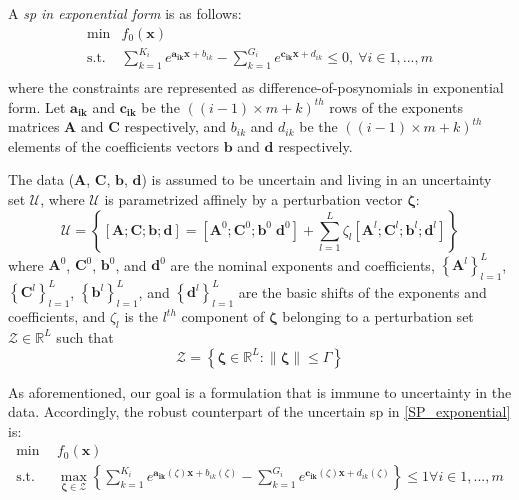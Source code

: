 A \emph{\gls{sp} in exponential form} is as follows:
\begin{equation}
    \begin{split}
	\min & f_0\left(\mathbf{x}\right) \\
	\text{s.t.} & \textstyle{\sum}_{k=1}^{K_i}e^{\mathbf{a_{ik}}\mathbf{x} + b_{ik}} - \textstyle{\sum}_{k=1}^{G_i}e^{\mathbf{c_{ik}}\mathbf{x} + d_{ik}} \leq 0,~\forall i \in 1,...,m\\
\end{split}
\label{SP_exponential}
\end{equation}
where the constraints are represented as difference-of-posynomials in exponential form.
Let $\mathbf{a_{ik}}$ and $\mathbf{c_{ik}}$ be the $((i-1)\times m + k)^{th}$ rows of the exponents matrices
$\mathbf{A}$ and $\mathbf{C}$ respectively, and $b_{ik}$ and $d_{ik}$ be the $((i-1)\times m + k)^{th}$ elements
of the coefficients vectors $\mathbf{b}$ and $\mathbf{d}$ respectively.

The data ($\mathbf{A}$, $\mathbf{C}$, $\mathbf{b}$, $\mathbf{d}$) is assumed to be uncertain and
living in an uncertainty set $\mathcal{U}$, where $\mathcal{U}$ is parametrized
affinely by a perturbation vector $\mathbf{\zeta}$:
\begin{equation}
\mathcal{U} = \left\{\left[\mathbf{A};\mathbf{C};\mathbf{b};\mathbf{d}\right] = \left[\mathbf{A}^0;\mathbf{C}^0;\mathbf{b}^0\;\mathbf{d}^0 \right] +
\textstyle{\sum_{l=1}^{L}\zeta_l\left[\mathbf{A}^l;\mathbf{C}^l;\mathbf{b}^l; \mathbf{d}^l\right]}\right\}
\label{Data}
\end{equation}
where $\mathbf{A}^0$, $\mathbf{C}^0$, $\mathbf{b}^0$, and $\mathbf{d}^0$ are the nominal exponents and coefficients,
$\left\{\mathbf{A}^l\right\}_{l=1}^{L}$, $\left\{\mathbf{C}^l\right\}_{l=1}^{L}$, $\left\{\mathbf{b}^l\right\}_{l=1}^{L}$, and
$\left\{\mathbf{d}^l\right\}_{l=1}^{L}$ are the basic shifts of the exponents and coefficients,
and $\zeta_l$ is the $l^{th}$ component of $\mathbf{\zeta}$ belonging to a perturbation set $\mathcal{Z} \in \mathbb{R}^L$ such that
\begin{equation}
\mathcal{Z} = \left\{ \mathbf{\zeta} \in \mathbb{R}^L: \left\lVert \mathbf{\zeta} \right\rVert \leq \Gamma \right\}
\label{perturbation_set}
\end{equation}

As aforementioned, our goal is a formulation that is immune to
uncertainty in the data. Accordingly, the robust counterpart
of the uncertain \gls{sp} in \eqref{SP_exponential} is:
\begin{equation}
    \label{SP_counterparts_finite}
    \begin{split}
        \min &~~f_0\left(\mathbf{x}\right)\\
        \text{s.t.} &~~\max_{\mathbf{\zeta} \in \mathcal{Z}} \left\{\textstyle{\sum}_{k=1}^{K_i}e^{\mathbf{a_{ik}}\left(\zeta\right)\mathbf{x} + b_{ik}\left(\zeta\right)} - \textstyle{\sum}_{k=1}^{G_i}e^{\mathbf{c_{ik}}\left(\zeta\right)\mathbf{x} + d_{ik}\left(\zeta\right)}\right\} \leq 1 \forall i \in 1,...,m\\
    \end{split}
\end{equation}

